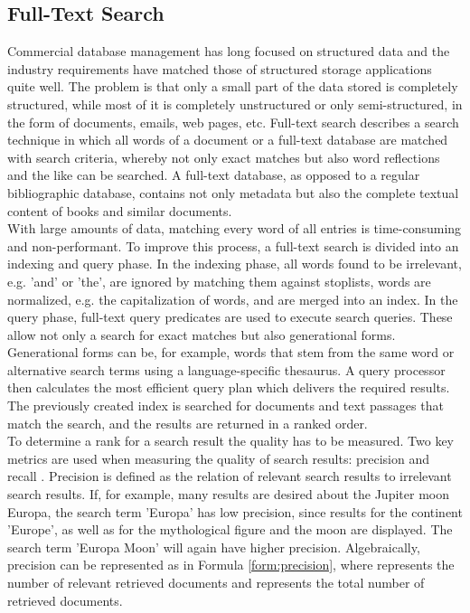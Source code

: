 \subsection{Full-Text Search}
Commercial database management has long focused on structured data and the industry requirements have matched those of structured storage applications quite well.
The problem is that only a small part of the data stored is completely structured, while most of it is completely unstructured or only semi-structured, in the form of documents, emails, web pages, etc. \parencite[cf.][p. 7]{hamilton_microsoft_2001} Full-text search describes a search technique in which all words of a document or a full-text database are matched with search criteria, whereby not only exact matches but also word reflections and the like can be searched. A full-text database, as opposed to a regular bibliographic database, contains not only metadata but also the complete textual content of books and similar documents. \parencite[cf.][pp. 2-3]{tenopir_full_1990}\\
With large amounts of data, matching every word of all entries is time-consuming and non-performant. To improve this process, a full-text search is divided into an indexing and query phase. In the indexing phase, all words found to be irrelevant, e.g. 'and' or 'the', are ignored by matching them against stoplists, words are normalized, e.g. the capitalization of words, and are merged into an index. \parencite[cf.][p. 11]{coles_pro_2009} In the query phase, full-text query predicates are used to execute search queries. These allow not only a search for exact matches but also generational forms. Generational forms can be, for example, words that stem from the same word or alternative search terms using a language-specific thesaurus. A query processor then calculates the most efficient query plan which delivers the required results. The previously created index is searched for documents and text passages that match the search, and the results are returned in a ranked order. \parencite[cf.][pp. 11-12]{coles_pro_2009}\\
To determine a rank for a search result the quality has to be measured. Two key metrics are used when measuring the quality of search results: precision \symp and recall \symr.
Precision is defined as the relation of relevant search results to irrelevant search results. If, for example, many results are desired about the Jupiter moon Europa, the search term 'Europa' has low precision, since results for the continent 'Europe', as well as for the mythological figure and the moon are displayed. The search term 'Europa Moon' will again have higher precision. Algebraically, precision can be represented as in Formula \ref{form:precision}, where \symn represents the number of relevant retrieved documents and \symd represents the total number of retrieved documents.
